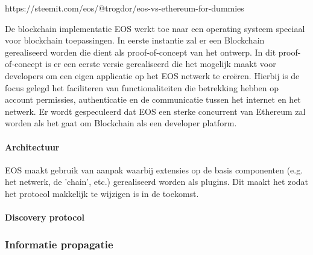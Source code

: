https://steemit.com/eos/@trogdor/eos-vs-ethereum-for-dummies

De blockchain implementatie EOS werkt toe naar een operating systeem speciaal voor blockchain toepassingen. In eerste instantie zal er een Blockchain gerealiseerd worden die dient als proof-of-concept van het ontwerp. In dit proof-of-concept is er een eerste versie gerealiseerd die het mogelijk maakt voor developers om een eigen applicatie op het EOS netwerk te creëren. Hierbij is de focus gelegd het faciliteren van functionaliteiten die betrekking hebben op account permissies, authenticatie en de communicatie tussen het internet en het netwerk. Er wordt gespeculeerd dat EOS een sterke concurrent van Ethereum zal worden als het gaat om Blockchain als een developer platform.

\paragraph{Architectuur}

EOS maakt gebruik van aanpak waarbij extensies op de basis componenten (e.g. het netwerk, de 'chain', etc.) gerealiseerd worden als plugins. Dit maakt het zodat het protocol makkelijk te wijzigen is in de toekomst. 
\paragraph{Discovery protocol}

\subsubsection{Informatie propagatie}